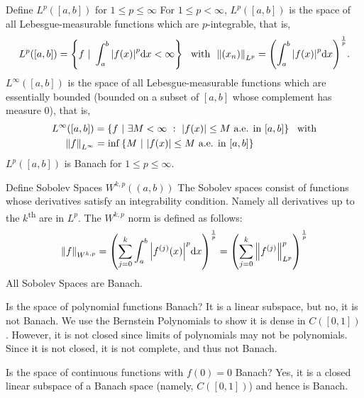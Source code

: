 \documentclass[avery5388,grid,frame]{flashcards}
\begin{document}
\begin{flashcard}
    {Define $L^p([a,b])$ for $1 \leq p \leq \infty$}
    For $1 \leq p < \infty$, $L^p([a,b])$ is the space of all Lebesgue-measurable functions which are $p$-integrable, that is,
    \begin{align*}
        L^p([a,b]) = \left\{f\ |\ \int_a^b\abs{f(x)}^p \dd x < \infty\right\} \ \ \text{with} \ \ \norm{(x_n)}_{L^p} = \qty(\int_a^b \abs{f(x)}^p \dd x)^{\frac{1}{p}}.
    \end{align*}
    $L^\infty([a,b])$ is the space of all Lebesgue-measurable functions which are essentially bounded (bounded on a subset of $[a,b]$ whose complement has measure $0$), that is,
    \begin{align*}
        L^\infty([a,b]) = \left\{f\ |\ \exists M < \infty\ :\ \abs{f(x)} \leq M \text{ a.e. in } [a,b]\right\} \ \ \text{with} \\
        \norm{f}_{L^\infty} = \inf\left\{M\ |\ \abs{f(x)} \leq M \text{ a.e. in } [a,b]\right\} \qquad \qquad \qquad \
    \end{align*}
    $L^p([a,b])$ is Banach for $1 \leq p \leq \infty$.
\end{flashcard}

\begin{flashcard}
    {Define Sobolev Spaces $W^{k,p}((a,b))$}
    The Sobolev spaces consist of functions whose derivatives satisfy an integrability condition.  Namely all derivatives up to the $k$\textsuperscript{th} are in $L^p$.  The $W^{k,p}$ norm is defined as follows:
    \begin{align*}
        \norm{f}_{W^{k,p}} = \qty(\sum_{j=0}^k \int_a^b \abs{f^{(j)}(x)}^p \dd x)^{\frac{1}{p}} = \qty(\sum_{j=0}^k \norm{f^{(j)}}_{L^p}^p)^\frac{1}{p}
    \end{align*}
    All Sobolev Spaces are Banach.
\end{flashcard}

\begin{flashcard}
    {Is the space of polynomial functions Banach?}
    It is a linear subspace, but no, it is not Banach.  We use the Bernstein Polynomials to show it is dense in $C([0,1])$.  However, it is not closed since limits of polynomials may not be polynomials.  Since it is not closed, it is not complete, and thus not Banach.
\end{flashcard}

\begin{flashcard}
    {Is the space of continuous functions with $f(0) = 0$ Banach?}
    Yes, it is a closed linear subspace of a Banach space (namely, $C([0,1])$) and hence is Banach.
\end{flashcard}
\end{document}
